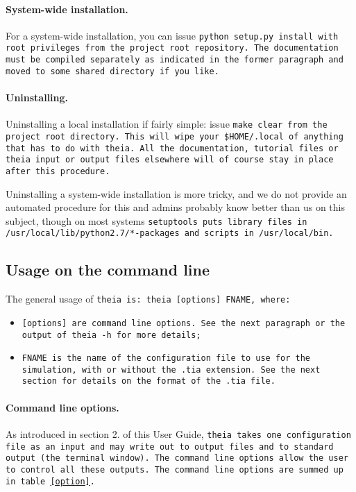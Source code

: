 \documentclass{article}
\begin{document}

\paragraph{System-wide installation.}For a system-wide installation, you can issue \tt{python setup.py install} with root privileges from the project root repository. The documentation must be compiled separately as indicated in the former paragraph and moved to some shared directory if you like.

\paragraph{Uninstalling.} Uninstalling a local installation if fairly simple: issue \tt{make clear} from the project root directory. This will wipe your \tt{\$HOME/.local} of anything that has to do with \tt{theia}. All the documentation, tutorial files or \tt{theia} input or output files elsewhere will of course stay in place after this procedure.

Uninstalling a system-wide installation is more tricky, and we do not provide an automated procedure for this and admins probably know better than us on this subject, though on most systems \tt{setuptools} puts library files in \tt{/usr/local/lib/python2.7/*-packages} and scripts in \tt{/usr/local/bin}.

\subsection{Usage on the command line}
The general usage of \tt{theia} is: \tt{theia [options] FNAME}, where:

\begin{itemize}
\item \tt{[options]} are command line options. See the next paragraph or the output of \tt{theia -h} for more details;
\item \tt{FNAME} is the name of the configuration file to use for the simulation, with or without the \tt{.tia} extension. See the next section for details on the format of the \tt{.tia} file.
\end{itemize}

\paragraph{Command line options.}As introduced in section 2. of this User Guide, \tt{theia} takes one configuration file as an input and may write out to output files and to standard output (the terminal window). The command line options allow the user to control all these outputs. The command line options are summed up in table \ref{option}.
\end{document}
